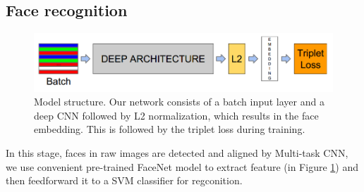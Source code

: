 \documentclass[journal, twocolumn]{IEEEtran}
\begin{document}
\subsection{Face recognition}
\label{face-recognition}
\begin{figure}
    \centering
    \includegraphics[width=1\linewidth]{img/pipeline.png}
	\caption{Model structure. Our network consists of a batch input layer and a deep CNN 
followed by L2 normalization, which results in the face embedding. This is followed by the triplet loss during training.}\label{fig:pipeline}
\end{figure}

In this stage, faces in raw images are detected and aligned by Multi-task CNN, we use convenient pre-trained FaceNet model to extract feature (in Figure \ref{fig:pipeline}) and then feedforward it to a SVM classifier for regconition. 
\end{document}
